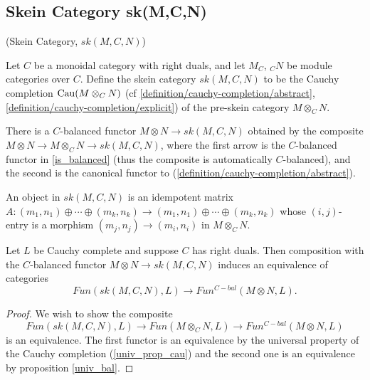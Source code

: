 \subsection{Skein Category sk(M,C,N)}

\begin{definition} (Skein Category, $sk(M,C,N)$)

  \noindent Let $C$ be a monoidal category with right duals, and let $M_C$,
  $_{C}N$ be module categories over $C$. Define the skein category $sk(M,C,N)$
  to be the Cauchy completion $\operatorname{Cau}(M \otimes_{C} N)$ (cf
  \ref{definition/cauchy-completion/abstract},
  \ref{definition/cauchy-completion/explicit}) of the pre-skein category $M
  \otimes_{C} N$.
\end{definition}

\begin{remark}
  There is a $C$-balanced functor $M\otimes N \to sk(M,C,N)$ obtained by the
  composite $M\otimes N\to M\otimes_C N\to sk(M,C,N)$, where the first arrow
  is the $C$-balanced functor in \ref{is_balanced} (thus the composite is
  automatically $C$-balanced), and the second is the canonical functor to
  (\ref{definition/cauchy-completion/abstract}).
\end{remark}

\begin{remark}
  An object in $sk(M,C,N)$ is an idempotent matrix
  $A:(m_1,n_1)\oplus\cdots\oplus (m_k,n_k)\to (m_1,n_1)\oplus\cdots\oplus
  (m_k,n_k)$ whose $(i,j)$-entry is a morphism $(m_j,n_j)\to (m_i,n_i)$ in
  $M\otimes_C N$.
\end{remark}

\begin{proposition}\label{univ_sk}
  Let $L$ be Cauchy complete and suppose $C$ has right duals. Then composition
  with the $C$-balanced functor $M\otimes N\to sk(M,C,N)$ induces an
  equivalence of categories $$Fun(sk(M,C,N),L)\to Fun^{C-bal}(M\otimes N,L).$$
\end{proposition}

\begin{proof}
  We wish to show the composite $$Fun(sk(M,C,N),L)\to Fun(M\otimes_C N, L)\to
  Fun^{C-bal}(M\otimes N,L)$$ is an equivalence. The first functor is an
  equivalence by the universal property of the Cauchy completion
  (\ref{univ_prop_cau}) and the second one is an equivalence by proposition
  \ref{univ_bal}.
\end{proof}

